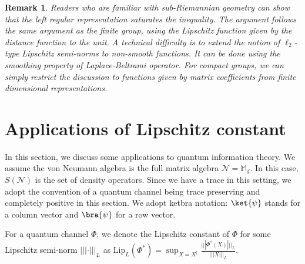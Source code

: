 \documentclass[11pt,reqno]{amsart}
\numberwithin{equation}{section}
\newtheorem{remark}[lemma]{Remark}
\newcommand{\mb}{\mathbb}
\newcommand{\mc}{\mathcal}
\newcommand{\Lip}{\mathrm{Lip}}
\begin{document}
\begin{remark}
    Readers who are familiar with sub-Riemannian geometry can show that the left regular representation saturates the inequality. The argument follows the same argument as the finite group, using the Lipschitz function given by the distance function to the unit. A technical difficulty is to extend the notion of $\ell_2$-type Lipschitz semi-norms to non-smooth functions. It can be done using the smoothing property of Laplace-Beltrami operator. For compact groups, we can simply restrict the discussion to functions given by matrix coefficients from finite dimensional representations.
\end{remark}







\section{Applications of Lipschitz constant}\label{sec:application Lipschitz constant}
In this section, we discuss some applications to quantum information theory. We assume the von Neumann algebra is the full matrix algebra $\mc N = \mb M_d$. In this case, $S(\mc N)$ is the set of density operators. Since we have a trace in this setting, we adopt the convention of a quantum channel being trace preserving and completely positive in this section. We adopt ketbra notation: $\ket{\psi}$ stands for a column vector and $\bra{\psi}$ for a row vector. 

For a quantum channel $\Phi$, we denote the Lipschitz constant of $\Phi$ for some Lipschitz semi-norm $|||\cdot|||_L$ as $\Lip_L(\Phi^*) = \sup_{X=X^\dagger} \frac{|||\Phi^*(X)|||_L}{|||X|||_L}$. 
\end{document}
